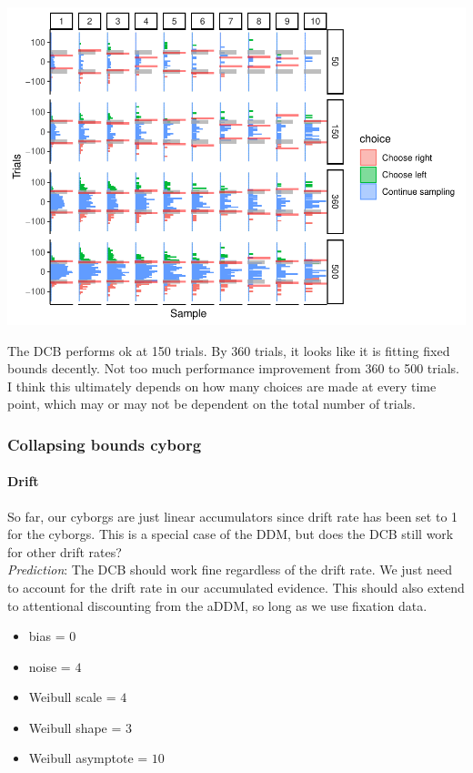 \documentclass[
]{book}
\providecommand{\tightlist}{%
  \setlength{\itemsep}{0pt}\setlength{\parskip}{0pt}}
\begin{document}
\includegraphics{LateNightBayes_files/figure-latex/unnamed-chunk-10-1.pdf}

The DCB performs ok at 150 trials. By 360 trials, it looks like it is fitting fixed bounds decently. Not too much performance improvement from 360 to 500 trials. I think this ultimately depends on how many choices are made at every time point, which may or may not be dependent on the total number of trials.

\hypertarget{collapsing-bounds-cyborg-3}{%
\subsubsection{Collapsing bounds cyborg}\label{collapsing-bounds-cyborg-3}}

\hypertarget{drift-1}{%
\paragraph*{Drift}\label{drift-1}}

So far, our cyborgs are just linear accumulators since drift rate has been set to 1 for the cyborgs. This is a special case of the DDM, but does the DCB still work for other drift rates?\\
\emph{Prediction}: The DCB should work fine regardless of the drift rate. We just need to account for the drift rate in our accumulated evidence. This should also extend to attentional discounting from the aDDM, so long as we use fixation data.

\begin{itemize}
\tightlist
\item
  bias = \(0\)
\item
  noise = \(4\)
\item
  Weibull scale = \(4\)
\item
  Weibull shape = \(3\)
\item
  Weibull asymptote = \(10\)
\end{itemize}
\end{document}
